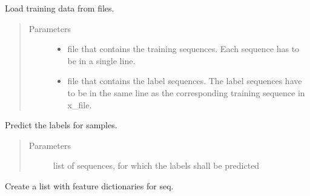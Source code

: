 \documentclass[letterpaper,10pt,english]{sphinxmanual}
\begin{document}
\begin{fulllineitems}

\begin{fulllineitems}
\label{\detokenize{api:product_crf.ProductnameCRF.load_files}}
Load training data from files.
\begin{quote}\begin{description}
\item[{Parameters}] \leavevmode\begin{itemize}
\item {} 
 \textendash{} file that contains the training sequences. Each
sequence has to be in a single line.

\item {} 
 \textendash{} file that contains the label sequences. The label
sequences have to be in the same line as the corresponding
training sequence in x\_file.

\end{itemize}

\end{description}\end{quote}

\end{fulllineitems}


\begin{fulllineitems}
\label{\detokenize{api:product_crf.ProductnameCRF.predict}}
Predict the labels for samples.
\begin{quote}\begin{description}
\item[{Parameters}] \leavevmode
{} \textendash{} list of sequences, for which the labels shall be
predicted

\end{description}\end{quote}

\end{fulllineitems}


\begin{fulllineitems}
\label{\detokenize{api:product_crf.ProductnameCRF.seq2feat}}
Create a list with feature dictionaries for seq.


\end{fulllineitems}
\end{fulllineitems}
\end{document}
